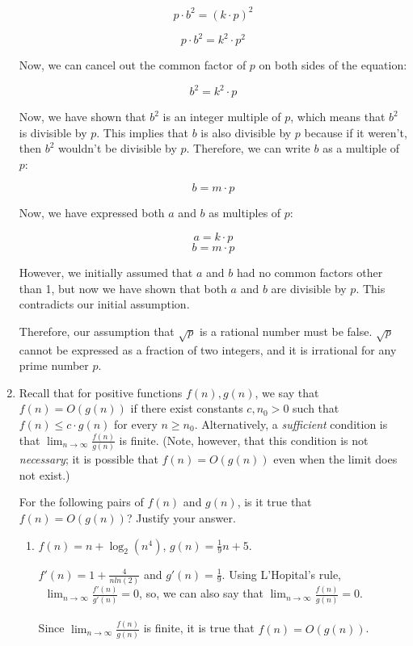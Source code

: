 \documentclass[11pt]{exam}
\begin{document}
\begin{enumerate}
\begin{solution}
\[
p \cdot b^2 = (k \cdot p)^2
\]

\[
p \cdot b^2 = k^2 \cdot p^2
\]

Now, we can cancel out the common factor of $p$ on both sides of the equation:

\[
b^2 = k^2 \cdot p
\]

Now, we have shown that $b^2$ is an integer multiple of $p$, which means that $b^2$ is divisible by $p$. This implies that $b$ is also divisible by $p$ because if it weren't, then $b^2$ wouldn't be divisible by $p$. Therefore, we can write $b$ as a multiple of $p$:

\[
b = m \cdot p
\]

Now, we have expressed both $a$ and $b$ as multiples of $p$:

\[
a = k \cdot p
\]
\[
b = m \cdot p
\]

However, we initially assumed that $a$ and $b$ had no common factors other than 1, but now we have shown that both $a$ and $b$ are divisible by $p$. This contradicts our initial assumption.

Therefore, our assumption that $\sqrt{p}$ is a rational number must be false. $\sqrt{p}$ cannot be expressed as a fraction of two integers, and it is irrational for any prime number $p$.


    \end{solution}

  \item Recall that for positive functions $f(n),g(n)$, we say that $f(n) = O(g(n))$ if there exist constants $c, n_0 > 0$ such that $f(n) \leq c\cdot  g(n)$ for every $n \geq n_0$. Alternatively, a \emph{sufficient} condition is that $\lim_{n \to \infty} \frac{f(n)}{g(n)}$ is finite. (Note, however, that this condition is not \emph{necessary}; it is possible that $f(n)=O(g(n))$ even when the limit does not exist.)
  
  For the following pairs of $f(n)$ and $g(n)$, is it true that $f(n) = O(g(n))$? Justify your answer. 
  	\begin{enumerate}
    
	  \item $f(n) = n + \log_2(n ^ 4)$, $g(n) = \frac{1}{9} n + 5$.
	  
	    \begin{solution}
$f'(n)=1+\frac{4}{nln(2)}$ and $g'(n) = \frac{1}{9}$. Using L'Hopital's rule,\\\
$\lim_{n \to \infty} \frac{f'(n)}{g'(n)} = 0$, so, we can also say that $\lim_{n \to \infty} \frac{f(n)}{g(n)} = 0$.\\\\
Since $\lim_{n \to \infty} \frac{f(n)}{g(n)}$ is finite, it is true that $f(n) = O(g(n))$.
    	\end{solution}


\end{enumerate}
\end{enumerate}
\end{document}
